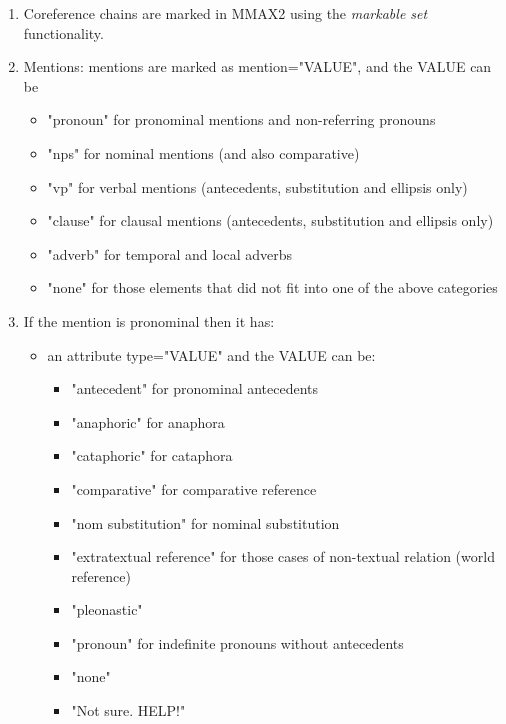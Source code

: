 \documentclass[a4paper]{article}
\begin{document}
\begin{enumerate}

\item Coreference chains are marked in MMAX2 using the \emph{markable set}
functionality.

\item Mentions: mentions are marked as mention="VALUE", and the VALUE can be 
\begin{itemize}
\item "pronoun" for pronominal mentions and non-referring pronouns
\item "nps" for nominal mentions (and also comparative)
\item "vp" for verbal mentions (antecedents, substitution and ellipsis  only)
\item "clause" for clausal mentions (antecedents, substitution and ellipsis  only)
\item "adverb" for temporal and local adverbs
\item "none" for those elements that did not fit into one of the above categories 
\end{itemize}

\item If the mention is pronominal then it has:
\begin{itemize}
\item  an attribute type="VALUE" and the VALUE can be:
\begin{itemize}
\item "antecedent" for pronominal antecedents 
\item "anaphoric" for anaphora
\item "cataphoric" for cataphora
\item "comparative" for comparative reference
\item "nom substitution" for nominal substitution
\item "extratextual reference" for those cases of non-textual relation (world reference)
\item "pleonastic"
\item "pronoun" for indefinite pronouns without antecedents
\item "none"
 \item "Not sure. HELP!"
 \end{itemize}
 

\end{itemize}
\end{enumerate}
\end{document}
